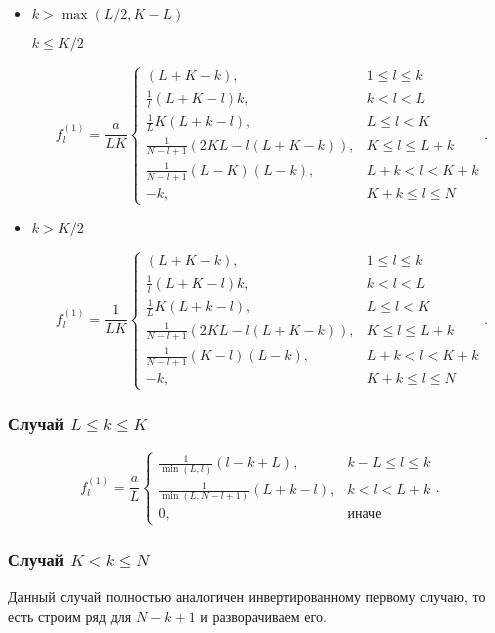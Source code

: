 \documentclass[specialist,
               substylefile = spbu.rtx,
               subf,href,colorlinks=true, 12pt]{disser}
\begin{document}
\begin{itemize}
\item
$k > \max(L / 2, K - L)$

$k \leq K/2$

$$f^{(1)}_l = \frac{a}{{LK}}
\begin{cases}
	(L + K - k), & \text{$1 \leq l \leq k$}\\
	\frac{1}{l}(L + K - l)k, & \text{$k < l < L$}\\
	\frac{1}{L}K(L + k - l), &\text{$L \leq l < K$}\\
	\frac{1}{N - l + 1}(2KL - l(L + K - k)), &\text{$K \leq l \leq L + k$}\\
	\frac{1}{N - l + 1}(L - K)(L - k), &\text{$L + k < l < K + k$}\\
	-k, &\text{$K + k \leq l \leq N$}
\end{cases}.
$$

\item
$k > K/2$


$$f^{(1)}_l = \frac{1}{{LK}}
\begin{cases}
	(L + K - k), & \text{$1 \leq l \leq k$}\\
	\frac{1}{l}(L + K - l)k, & \text{$k < l < L$}\\
	\frac{1}{L}K(L + k - l), &\text{$L \leq l < K$}\\
	\frac{1}{N - l + 1}(2KL - l(L + K - k)), &\text{$K \leq l \leq L + k$}\\
	\frac{1}{N - l + 1}(K - l)(L - k), &\text{$L + k < l < K + k$}\\
	-k, &\text{$K + k \leq l \leq N $}
\end{cases}.
$$
\end{itemize}

\subsubsection{Случай $L \leq k \leq K$}

$$f^{(1)}_l = \frac{a}{{L}}
\begin{cases}
	\frac{1}{\min(L, l)}(l - k + L), & \text{$k - L \leq l \leq k$}\\
	\frac{1}{\min(L, N - l + 1)}(L + k - l), & \text{$k < l < L + k$}\\
	0, & \text{иначе}
\end{cases}.$$


\subsubsection{Случай $K < k \leq N$}
\label{sub:const_noise}
Данный случай полностью аналогичен инвертированному первому случаю, то есть строим ряд для $N - k + 1$ и разворачиваем его.
\end{document}
